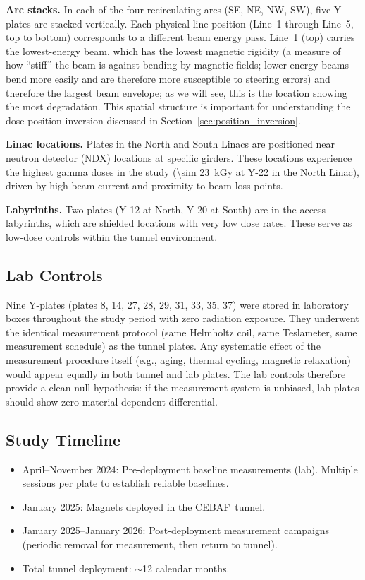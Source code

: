 \documentclass[11pt,letterpaper]{article}
\newcommand{\CEBAF}{CEBAF}
\begin{document}
\textbf{Arc stacks.} In each of the four recirculating arcs (SE, NE, NW, SW),
five Y-plates are stacked vertically. Each physical line position (Line~1
through Line~5, top to bottom) corresponds to a different beam energy pass.
Line~1 (top) carries the lowest-energy beam, which has the lowest magnetic
rigidity (a measure of how ``stiff'' the beam is against bending by magnetic
fields; lower-energy beams bend more easily and are therefore more susceptible
to steering errors) and therefore the largest beam envelope; as we will see,
this is the location showing the most degradation. This spatial structure is important for understanding the
dose-position inversion discussed in Section~\ref{sec:position_inversion}.

\textbf{Linac locations.} Plates in the North and South Linacs are positioned
near neutron detector (NDX) locations at specific girders. These locations
experience the highest gamma doses in the study (\SI{\sim 23}{kGy} at Y-22 in
the North Linac), driven by high beam current and proximity to beam loss
points.

\textbf{Labyrinths.} Two plates (Y-12 at North, Y-20 at South) are in the
access labyrinths, which are shielded locations with very low dose rates. These serve as
low-dose controls within the tunnel environment.

\subsection{Lab Controls}

Nine Y-plates (plates 8, 14, 27, 28, 29, 31, 33, 35, 37) were stored in
laboratory boxes throughout the study period with zero radiation exposure. They
underwent the identical measurement protocol (same Helmholtz coil,
same Teslameter, same measurement schedule) as the tunnel plates. Any
systematic effect of the measurement procedure itself (e.g., aging, thermal
cycling, magnetic relaxation) would appear equally in both tunnel and lab
plates. The lab controls therefore provide a clean null hypothesis: if the
measurement system is unbiased, lab plates should show zero
material-dependent differential.

\subsection{Study Timeline}

\begin{itemize}
    \item April--November 2024: Pre-deployment baseline measurements
    (lab). Multiple sessions per plate to establish reliable baselines.
    \item January 2025: Magnets deployed in the \CEBAF~tunnel.
    \item January 2025--January 2026: Post-deployment measurement
    campaigns (periodic removal for measurement, then return to tunnel).
    \item Total tunnel deployment: $\sim$12 calendar months.
\end{itemize}
\end{document}
